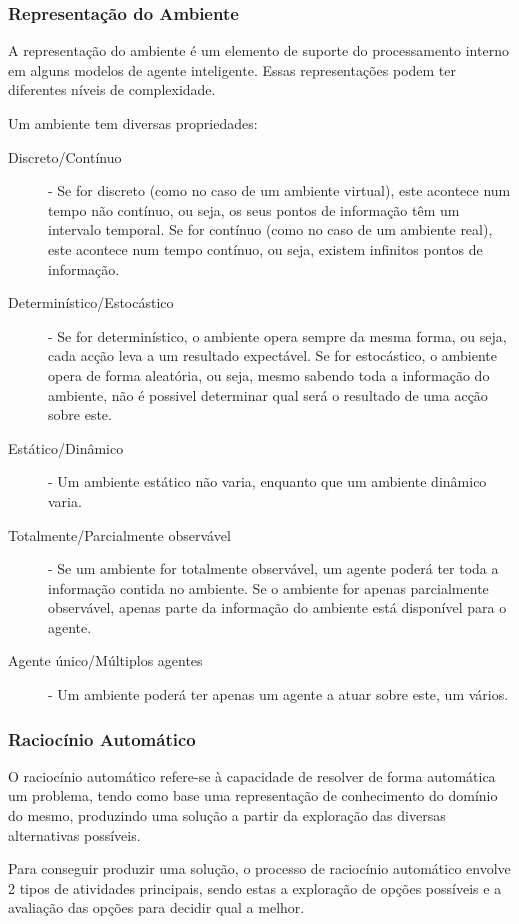 \documentclass[a4paper,12pt]{article}
\begin{document}
\subsubsection{Representação do Ambiente}
A representação do ambiente é um elemento de suporte do processamento interno em alguns modelos de agente inteligente.
Essas representações podem ter diferentes níveis de complexidade.

Um ambiente tem diversas propriedades:
\begin{description}
	\item[Discreto/Contínuo] - Se for discreto (como no caso de um ambiente virtual), este acontece num tempo não contínuo, ou seja, os seus pontos de informação têm um intervalo temporal. Se for contínuo (como no caso de um ambiente real), este acontece num tempo contínuo, ou seja, existem infinitos pontos de informação.
	\item[Determinístico/Estocástico] - Se for determinístico, o ambiente opera sempre da mesma forma, ou seja, cada acção leva a um resultado expectável. Se for estocástico, o ambiente opera de forma aleatória, ou seja, mesmo sabendo toda a informação do ambiente, não é possivel determinar qual será o resultado de uma acção sobre este.
	\item[Estático/Dinâmico] - Um ambiente estático não varia, enquanto que um ambiente dinâmico varia.
	\item[Totalmente/Parcialmente observável] - Se um ambiente for totalmente observável, um agente poderá ter toda a informação contida no ambiente. Se o ambiente for apenas parcialmente observável, apenas parte da informação do ambiente está disponível para o agente.
	\item[Agente único/Múltiplos agentes] - Um ambiente poderá ter apenas um agente a atuar sobre este, um vários.
\end{description}

\subsubsection{Raciocínio Automático}

O raciocínio automático refere-se à capacidade de resolver de forma automática um problema, tendo como base uma representação de conhecimento do domínio do mesmo, produzindo uma solução a partir da exploração das diversas alternativas possíveis.

Para conseguir produzir uma solução, o processo de raciocínio automático envolve 2 tipos de atividades principais, sendo estas a exploração de opções possíveis e a avaliação das opções para decidir qual a melhor.
\end{document}
